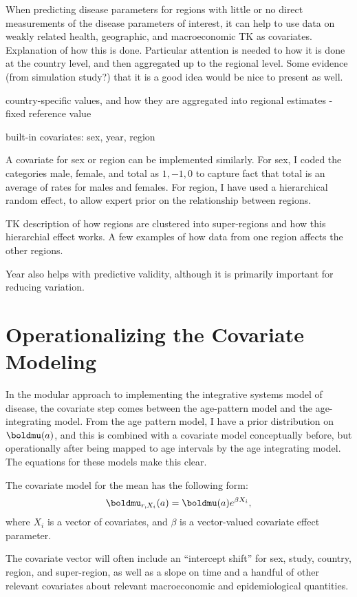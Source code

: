 When predicting disease parameters for regions with little or no
direct measurements of the disease parameters of interest, it can help
to use data on weakly related health, geographic, and macroeconomic TK
as covariates. Explanation of how this is done.  Particular attention
is needed to how it is done at the country level, and then aggregated
up to the regional level. Some evidence (from simulation study?) that
it is a good idea would be nice to present as well.

country-specific values, and how they are aggregated into regional
estimates - fixed reference value

built-in covariates: sex, year, region


A covariate for sex or region can be implemented similarly.  For sex,
I coded the categories male, female, and total as $1, -1, 0$ to
capture fact that total is an average of rates for males and females.
For region, I have used a hierarchical random effect, to allow expert
prior on the relationship between regions.

TK description of how regions are clustered into super-regions and how
this hierarchial effect works.  A few examples of how data from one
region affects the other regions.

Year also helps with predictive validity, although it is primarily
important for reducing variation.


\section{Operationalizing the Covariate Modeling}

In the modular approach to implementing the integrative systems model
of disease, the covariate step comes between the age-pattern model and
the age-integrating model.  From the age pattern model, I have a prior
distribution on $\boldmu(a)$, and this is combined with a covariate
model conceptually before, but operationally after being mapped to age
intervals by the age integrating model.  The equations for these
models make this clear.

The covariate model for the mean has the following form:
\[
\boldmu_{r,X_i}(a) = \boldmu(a) e^{\beta X_i},
\]
where $X_i$ is a vector of covariates, and $\beta$ is a vector-valued
covariate effect parameter.

The covariate vector will often include an ``intercept shift'' for
sex, study, country, region, and super-region, as well as a slope on
time and a handful of other relevant covariates about relevant
macroeconomic and epidemiological quantities.

